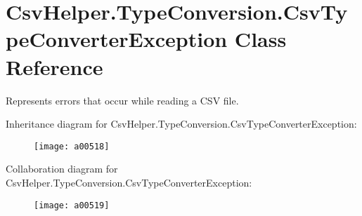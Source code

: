\hypertarget{a00080}{\section{Csv\-Helper.\-Type\-Conversion.\-Csv\-Type\-Converter\-Exception Class Reference}
\label{a00080}
}


Represents errors that occur while reading a C\-S\-V file.  




Inheritance diagram for Csv\-Helper.\-Type\-Conversion.\-Csv\-Type\-Converter\-Exception\-:
\nopagebreak
\begin{figure}[H]
\begin{center}
\leavevmode
\texttt{[image: a00518]}
\end{center}
\end{figure}


Collaboration diagram for Csv\-Helper.\-Type\-Conversion.\-Csv\-Type\-Converter\-Exception\-:
\nopagebreak
\begin{figure}[H]
\begin{center}
\leavevmode
\texttt{[image: a00519]}
\end{center}
\end{figure}
